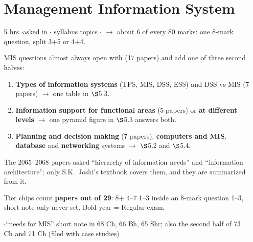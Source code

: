 \section{Management Information System}
{\color{sub}\footnotesize 5 hrs \gap$\cdot$\gap asked in 
\gap$\cdot$ syllabus topics \gap$\cdot$\gap {}
$\rightarrow$ about 6 of every 80 marks: one 8-mark question, split 3+5 or 4+4.}

\vspace{3pt}\noindent
\colorbox{gdL}{\makebox[\dimexpr\textwidth-2\fboxsep][l]{%
  \textcolor{gd}{\bfseries\footnotesize READ THIS FIRST}}}
\par\nobreak\vspace{3pt}

MIS questions almost always open with  (17 papers)
and add one of three second halves:
\begin{enumerate}[label=\arabic*., leftmargin=1.4em, itemsep=1pt]
  \item \textbf{Types of information systems} (TPS, MIS, DSS, ESS) and DSS vs MIS
    (7 papers) $\rightarrow$ one table in $\S$5.3.
  \item \textbf{Information support for functional areas} (5 papers) or \textbf{at different
    levels} $\rightarrow$ one pyramid figure in $\S$5.3 answers both.
  \item \textbf{Planning and decision making} (7 papers), \textbf{computers and MIS},
    \textbf{database} and \textbf{networking} systems $\rightarrow$ $\S$5.2 and $\S$5.4.
\end{enumerate}
The 2065--2068 papers asked ``hierarchy of information needs'' and ``information
architecture''; only S.K.\ Joshi's textbook covers them, and they are summarized from it.

Tier chips count \textbf{papers out of 29}:  8+ \gap {} 4--7 \gap {} 1--3
inside an 8-mark question \gap {} 1--3, short note only \gap \tN{} never set.
Bold year = Regular exam.

\hr


{\color{sub}\footnotesize {}  \gap$\cdot$\gap ``needs for MIS'' short note in 68 Ch, 66 Bh, 65 Shr; also the second half of 73 Ch and 71 Ch (filed with case studies)}


